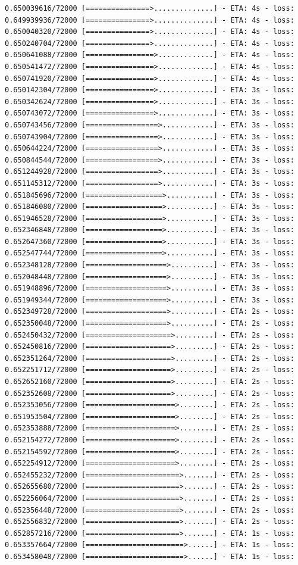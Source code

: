 \documentclass[12pt,fleqn]{article}\usepackage{../../common}
\begin{document}
\begin{verbatim}
0.650039616/72000 [===============>..............] - ETA: 4s - loss: 0.649939936/72000 [===============>..............] - ETA: 4s - loss: 0.650040320/72000 [===============>..............] - ETA: 4s - loss: 0.650240704/72000 [===============>..............] - ETA: 4s - loss: 0.650641088/72000 [================>.............] - ETA: 4s - loss: 0.650541472/72000 [================>.............] - ETA: 4s - loss: 0.650741920/72000 [================>.............] - ETA: 4s - loss: 0.650142304/72000 [================>.............] - ETA: 3s - loss: 0.650342624/72000 [================>.............] - ETA: 3s - loss: 0.650743072/72000 [================>.............] - ETA: 3s - loss: 0.650743456/72000 [=================>............] - ETA: 3s - loss: 0.650743904/72000 [=================>............] - ETA: 3s - loss: 0.650644224/72000 [=================>............] - ETA: 3s - loss: 0.650844544/72000 [=================>............] - ETA: 3s - loss: 0.651244928/72000 [=================>............] - ETA: 3s - loss: 0.651145312/72000 [=================>............] - ETA: 3s - loss: 0.651845696/72000 [==================>...........] - ETA: 3s - loss: 0.651846080/72000 [==================>...........] - ETA: 3s - loss: 0.651946528/72000 [==================>...........] - ETA: 3s - loss: 0.652346848/72000 [==================>...........] - ETA: 3s - loss: 0.652647360/72000 [==================>...........] - ETA: 3s - loss: 0.652547744/72000 [==================>...........] - ETA: 3s - loss: 0.652348128/72000 [===================>..........] - ETA: 3s - loss: 0.652048448/72000 [===================>..........] - ETA: 3s - loss: 0.651948896/72000 [===================>..........] - ETA: 3s - loss: 0.651949344/72000 [===================>..........] - ETA: 3s - loss: 0.652349728/72000 [===================>..........] - ETA: 2s - loss: 0.652350048/72000 [===================>..........] - ETA: 2s - loss: 0.652450432/72000 [====================>.........] - ETA: 2s - loss: 0.652450816/72000 [====================>.........] - ETA: 2s - loss: 0.652351264/72000 [====================>.........] - ETA: 2s - loss: 0.652251712/72000 [====================>.........] - ETA: 2s - loss: 0.652652160/72000 [====================>.........] - ETA: 2s - loss: 0.652352608/72000 [====================>.........] - ETA: 2s - loss: 0.652353056/72000 [=====================>........] - ETA: 2s - loss: 0.651953504/72000 [=====================>........] - ETA: 2s - loss: 0.652353888/72000 [=====================>........] - ETA: 2s - loss: 0.652154272/72000 [=====================>........] - ETA: 2s - loss: 0.652154592/72000 [=====================>........] - ETA: 2s - loss: 0.652254912/72000 [=====================>........] - ETA: 2s - loss: 0.652455232/72000 [======================>.......] - ETA: 2s - loss: 0.652655680/72000 [======================>.......] - ETA: 2s - loss: 0.652256064/72000 [======================>.......] - ETA: 2s - loss: 0.652356448/72000 [======================>.......] - ETA: 2s - loss: 0.652556832/72000 [======================>.......] - ETA: 2s - loss: 0.652857216/72000 [======================>.......] - ETA: 1s - loss: 0.653357664/72000 [=======================>......] - ETA: 1s - loss: 0.653458048/72000 [=======================>......] - ETA: 1s - loss: 
\end{verbatim}
\end{document}
